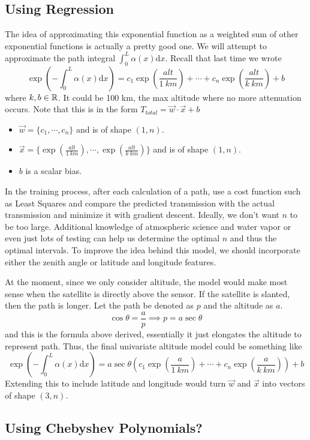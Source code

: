 \documentclass[12pt]{scrartcl}
\begin{document}
\subsection{Using Regression}

The idea of approximating this exponential function as a weighted sum of other
exponential functions is actually a pretty good one. We will attempt to
approximate the path integral $\int_0^L \alpha(x) \text{d}x$. Recall that last
time we wrote
\[\exp (-\int_0^L \alpha(x) \text{d}x) = c_1\exp(\frac{alt}{1 \ km}) + \cdots + c_n\exp(\frac{alt}{k \ km}) + b\]
where $k, b\in \mathbb R$. It could be 100 km, the max altitude where no more
attenuation occurs. Note that this is in the form $T_{total} = \vec{w} \cdot
    \vec{x} + b$
\begin{itemize}
    \item $\vec{w} = \{c_1, \cdots, c_n\}$ and is of shape $(1,n)$.
    \item $\vec{x} = \{\exp(\frac{alt}{1 \ km}), \cdots, \exp(\frac{alt}{k \ km})\}$ and is of shape $(1,n)$.
    \item $b$ is a scalar bias.
\end{itemize}
In the training process, after each calculation of a path, use a cost function such as Least Squares and compare the predicted transmission with the actual transmission and minimize it with gradient descent. Ideally, we don't want $n$ to be too large. Additional knowledge of atmospheric science and water vapor or even just lots of testing can help us determine the optimal $n$ and thus the optimal intervals. To improve the idea behind this model, we should incorporate either the zenith angle or latitude and longitude features.

At the moment, since we only consider altitude, the model would make most sense
when the satellite is directly above the sensor. If the satellite is slanted,
then the path is longer. Let the path be denoted as $p$ and the altitude as
$a$.
\[\cos\theta = \frac{a}{p} \implies p = a\sec\theta\]
and this is the formula above derived, essentially it just elongates the
altitude to represent path. Thus, the final univariate altitude model could be
something like
\[\exp (-\int_0^L \alpha(x) \text{d}x) = a \sec\theta (c_1\exp(\frac{a}{1 \ km}) + \cdots + c_n\exp(\frac{a}{k \ km})) + b\]
Extending this to include latitude and longitude would turn $\vec{w}$ and
$\vec{x}$ into vectors of shape $(3, n)$.

\subsection{Using Chebyshev Polynomials?}
\end{document}
